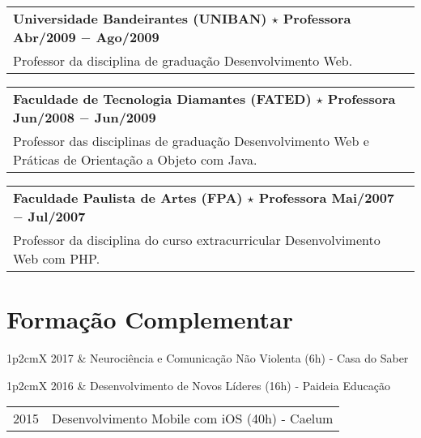 \documentclass[a4paper, oneside, final]{scrartcl}
\newcommand{\vspc}{\vspace{0.15cm}} %
\newcommand{\vspcitem}{\vspace{0.1cm}} %
\begin{document}
\begin{center}
\begin{tabularx}{1\linewidth}{X}
{\bf Universidade Bandeirantes (UNIBAN) $\star$ Professora \hfill Abr/2009 $-$ Ago/2009} \\
Professor da disciplina de graduação Desenvolvimento Web. \vspc\\
\end{tabularx}

\begin{tabularx}{1\linewidth}{X}
{\bf Faculdade de Tecnologia Diamantes (FATED) $\star$ Professora \hfill Jun/2008 $-$ Jun/2009} \\
Professor das disciplinas de graduação Desenvolvimento Web e Práticas de Orientação a Objeto com Java. \vspc\\
\end{tabularx}

\begin{tabularx}{1\linewidth}{X}
{\bf Faculdade Paulista de Artes (FPA) $\star$ Professora  \hfill Mai/2007 $-$ Jul/2007} \\
Professor da disciplina do curso extracurricular Desenvolvimento Web com PHP. \vspc\\
\end{tabularx}

\section{Formação Complementar}
\begin{tabularx}{1\linewidth}{p{2cm}X}
2017       &  Neurociência e Comunicação Não Violenta (6h) - Casa do Saber \vspcitem\\
\end{tabularx}
\begin{tabularx}{1\linewidth}{p{2cm}X}
2016       &  Desenvolvimento de Novos Líderes (16h) - Paideia Educação \vspcitem\\
\end{tabularx}

\begin{tabularx}{1\linewidth}{p{2cm}X}
2015       & Desenvolvimento Mobile com iOS (40h) - Caelum \vspcitem\\
\end{tabularx}


\end{center}
\end{document}
